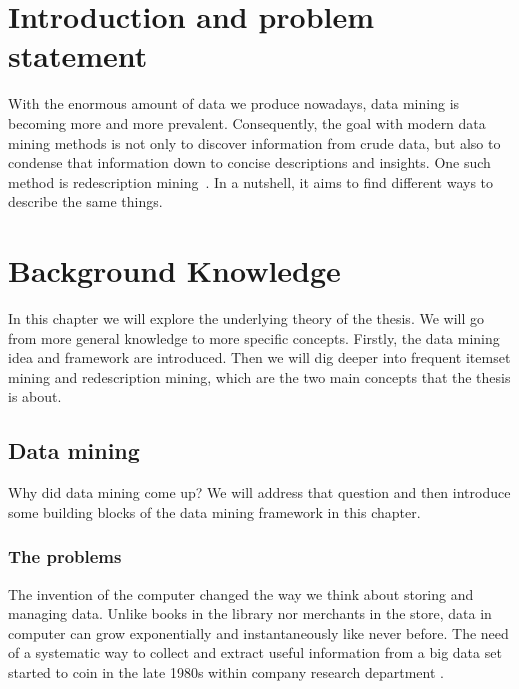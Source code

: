 \chapter{Introduction and problem statement}
\label{cha:intro}
With the enormous amount of data we produce nowadays, data mining is becoming more and more prevalent.
Consequently, the goal with modern data mining methods is not only to discover information from crude data, but also to condense that information down to concise descriptions and insights.
One such method is redescription mining~\citep{ramakrishnan_turning_2004}.
In a nutshell, it aims to find different ways to describe the same things.

\chapter{Background Knowledge}
\label{cha:background}
In this chapter we will explore the underlying theory of the thesis.
We will go from more general knowledge to more specific concepts.
Firstly, the data mining idea and framework are introduced.
Then we will dig deeper into frequent itemset mining and redescription mining, which are the two main concepts that the thesis is about.
\section{Data mining}
Why did data mining come up?
We will address that question and then introduce some building blocks of the data mining framework in this chapter.
\subsection{The problems}
\label{sub:the_problems}
The invention of the computer changed the way we think about storing and managing data.
Unlike books in the library nor merchants in the store, data in computer can grow exponentially and instantaneously like never before.
The need of a systematic way to collect and extract useful information from a big data set started to coin in the late 1980s within company research department  \citep{coenen_datamining_2011}.

